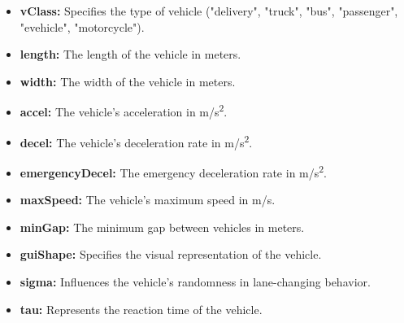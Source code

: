 \begin{itemize}
    \item \textbf{vClass:} Specifies the type of vehicle (\eg "delivery", "truck", "bus", "passenger", "evehicle", "motorcycle").
    \item \textbf{length:} The length of the vehicle in meters.
    \item \textbf{width:} The width of the vehicle in meters.
    \item \textbf{accel:} The vehicle's acceleration in \unit{m/s^2}.
    \item \textbf{decel:} The vehicle's deceleration rate in \unit{m/s^2}.
    \item \textbf{emergencyDecel:} The emergency deceleration rate in \unit{m/s^2}.
    \item \textbf{maxSpeed:} The vehicle's maximum speed in \unit{m/s}.
    \item \textbf{minGap:} The minimum gap between vehicles in meters.
    \item \textbf{guiShape:} Specifies the visual representation of the vehicle.
    \item \textbf{sigma:} Influences the vehicle's randomness in lane-changing behavior.
    \item \textbf{tau:} Represents the reaction time of the vehicle.
\end{itemize}

